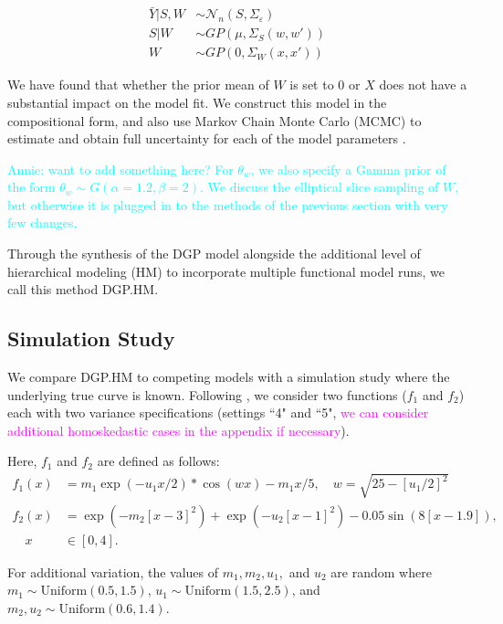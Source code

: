 \documentclass[11pt]{article}
\begin{document}
\begin{align}
\bar Y|S,W &\sim \mathcal{N}_n(S,\Sigma_\varepsilon) \\
S|W &\sim GP\left(\mu, \Sigma_S(w,w')\right) \\
W &\sim GP\left(0, \Sigma_W(x,x')\right)
\end{align}

We have found that whether the prior mean of $W$ is set to 0 or $X$ \citep[which would indicate stationarity apriori,][]{schmidt2003bayesian} does not have a substantial impact on the model fit. We construct this model in the compositional form, and also use Markov Chain Monte Carlo (MCMC) to estimate and obtain full uncertainty for each of the model parameters \citep{sauer2023active}.

\textcolor{cyan}{Annie: want to add something here? For $\theta_w$, we also specify a Gamma prior of the form $\theta_w \sim G(\alpha=1.2, \beta=2)$. We discuss the elliptical slice sampling of $W$, but otherwise it is plugged in to the methods of the previous section with very few changes.}

Through the synthesis of the DGP model alongside the additional level of hierarchical modeling (HM) to incorporate multiple functional model runs, we call this method DGP.HM.

\subsection{Simulation Study}
\label{subsec:sim}

We compare DGP.HM to competing models with a simulation study where the underlying true curve is known. Following \cite{moran2024dpc}, we consider two functions ($f_1$ and $f_2$) each with two variance specifications (settings ``4" and ``5", \textcolor{magenta}{we can consider additional homoskedastic cases in the appendix if necessary}). 

Here, $f_1$ and $f_2$ are defined as follows:
\begin{align}
  f_1(x) &= m_1 \exp(-u_1x/2) * \cos(wx) - m_1x/5, \quad w=\sqrt{25-[u_1/2]^2} \\
  f_2(x) &= \exp(-m_2[x-3]^2)+\exp(-u_2[x-1]^2)-0.05\sin(8[x-1.9]), \\ 
  \quad x &\in [0,4].
\end{align}

For additional variation, the values of $m_1, m_2, u_1,$ and $u_2$ are random where $m_1 \sim \text{Uniform}(0.5,1.5)$, $u_1 \sim \text{Uniform}(1.5,2.5)$, and $m_2,u_2 \sim \text{Uniform}(0.6,1.4)$. 
      
\end{document}
